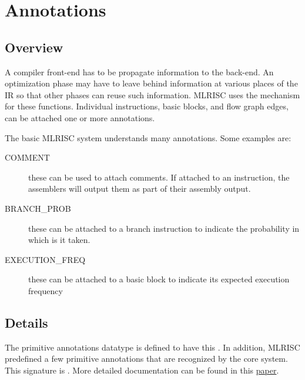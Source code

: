 \section{Annotations}

\subsection{Overview}
A compiler front-end has to be propagate information to
the back-end.  An optimization phase may have to leave behind information
at various places of the IR so that other phases can reuse such information.
MLRISC uses the 
mechanism for these functions.  
Individual instructions, basic blocks, and flow graph edges, 
can be attached one or more annotations.  

The basic MLRISC system understands many annotations.  Some examples are:
\begin{description}
   \item[COMMENT] 
         these can be used to attach comments.  If attached to
         an instruction, the assemblers will output 
         them as part of their assembly output.
   \item[BRANCH\_PROB]
          these can be attached to a branch instruction to indicate
          the probability in which is it taken.
   \item[EXECUTION\_FREQ]
          these can be attached to a basic block to indicate 
          its expected execution frequency 
\end{description}

\subsection{Details}
The primitive annotations datatype is defined
to have this .
In addition, MLRISC predefined a few primitive annotations that are
recognized by the core system.  This signature is
.
More detailed documentation can be found in this 
\href{http://cm.bell-labs.com/cm/cs/what/smlnj/compiler-notes/annotations.ps}{paper}.
